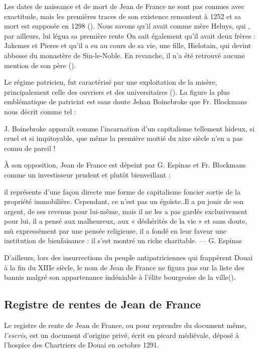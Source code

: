 Les dates de naissance et de mort de Jean de France ne sont pas connues avec exactitude, mais les premières traces de son existence remontent à 1252 et sa mort est supposée en 1298 (\cite{espinas_les_1933}). Nous savons qu'il avait comme mère Heluys, qui , par ailleurs, lui légua sa première rente
On sait également qu'il  avait deux frères : Jakemes et Pieres et qu'il a eu au cours de sa vie, une fille, Hielotain, qui devint abbesse du monastère de Sin-le-Noble. En revanche, il n'a été retrouvé aucune mention de son père (\cite{espinas_les_1933}).

Le régime patricien, fut caractérisé par une exploitation de la misère, principalement celle des ouvriers et des universitaires (\cite{blockmans_trois_1941}). La figure la plus emblématique de patriciat est sans doute Jehan Boinebroke  que Fr. Blockmans nous décrit comme tel :
\begin{displayquote} 
    \og J. Boinebroke apparaît comme l'incarnation d'un capitalisme tellement hideux, si cruel et si impitoyable, que même la première moitié du xixe siècle n'en a pas connu de pareil ! \fg{}
\end{displayquote}
\vspace{0,5cm}
À son opposition, Jean de France est dépeint par G. Espinas et Fr. Blockmans comme un investisseur prudent et plutôt bienveillant :
\begin{displayquote}
    \og [...] il représente d’une façon directe une forme de capitalisme foncier sortie de la propriété immobilière. Cependant, ce n’est pas un égoïste..Il a pu jouir de son argent, de ses revenus pour lui-même, mais il ne les a pas gardés exclusivement pour lui, il a pensé aux malheureux, aux « déshérités de la vie » et sans doute, mù expressément par une pensée religieuse, il a fondé en leur faveur une institution de bienfaisance : il s’est montré un riche charitable.\fg{} 
     — G. Espinas
\end{displayquote} 
\vspace{0,5cm}
D'ailleurs, lors des insurrections du peuple antipatriciennes qui frappèrent Douai à la fin du XIIIe siècle, le nom de Jean de France ne figura pas sur la liste des bannis malgré son appartenance indéniable à l'élite bourgeoise de la ville(\cite{espinas_les_1933}).

\subsection{Registre de rentes de Jean de France}
Le registre de rente de Jean de France, ou pour reprendre du document même, \textit{l'escris}, est un document d'origine privé, écrit en picard médiévale, déposé à l'hospice des Chartriers de Douai en octobre 1291. 


